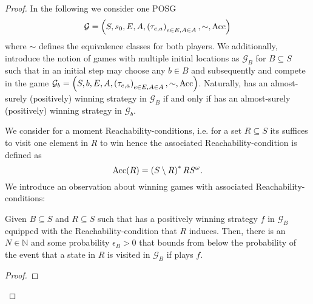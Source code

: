 \begin{proof}
  In the following we consider one \ac{POSG}
  \begin{equation*}
    \mathcal{G} = \left(S, s_{0}, E, A, \left(\tau_{e,a}\right)_{e\in E, A\in A}, 
      \sim, \operatorname{Acc}\right)
  \end{equation*}
  where $\sim$ defines the equivalence classes for both players. We 
  additionally, introduce the notion of games with multiple initial locations 
  as $\mathcal{G}_{B}$ for $B\subseteq S$ such that in an initial step \adam{}
  may choose any $b\in B$ and subsequently \eve{} and \adam{} compete in the
  game $\mathcal{G}_{b} = \left(S, b, E, A, 
  \left(\tau_{e,a}\right)_{e\in E, A\in A}, \sim, \operatorname{Acc}\right)$. Naturally, \eve{} has an 
  almost-surely (positively) winning strategy in $\mathcal{G}_{B}$ if and only 
  if \eve{} has an almost-surely (positively) winning strategy in 
  $\mathcal{G}_{b}$.

  We consider for a moment Reachability-conditions, i.e. for a set
  $R\subseteq S$ its suffices to visit one element in $R$ to win hence the 
  associated Reachability-condition is defined as 
  \begin{equation*}
    \operatorname{Acc}(R) = \left(S\setminus R\right)^{*}RS^{\omega}.
  \end{equation*}
  We introduce an observation about winning games with associated 
  Reachability-conditions:
  \begin{proposition}
    Given $B\subseteq S$ and $R\subseteq S$ such that \eve{} has a positively
    winning strategy $f$ in $\mathcal{G}_{B}$ equipped with the 
    Reachability-condition that $R$ induces. Then, there is an $N\in\mathbb{N}$
    and some probability $\epsilon_{B} > 0$ that bounds from below the 
    probability of the event that a state in $R$ is visited in 
    $\mathcal{G}_{B}$ if \eve{} plays $f$.
  \end{proposition}
  \begin{proof}
  \end{proof}
\end{proof}

